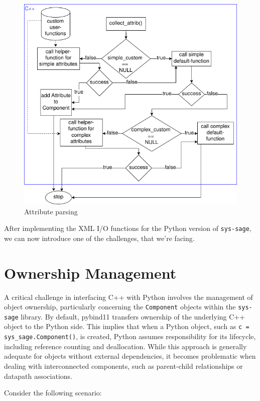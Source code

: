 \begin{figure}[htpb]
    \centering
    \includegraphics[width=\textwidth]{figures/Attribute_from_xml.png}
    \caption{Attribute parsing}
    \label{fig:Attribute parsing}
\end{figure}

After implementing the XML I/O functions for the Python version of \verb|sys-sage|, we can now introduce one of the challenges, that we're facing.
\newpage
\section{Ownership Management}

A critical challenge in interfacing C++ with Python involves the management of object ownership, particularly concerning the \verb|Component| objects within the \verb|sys-sage| library. By default, pybind11 transfers ownership of the underlying C++ object to the Python side. This implies that when a Python object, such as \verb|c = sys_sage.Component()|, is created, Python assumes responsibility for its lifecycle, including reference counting and deallocation. While this approach is generally adequate for objects without external dependencies, it becomes problematic when dealing with interconnected components, such as parent-child relationships or datapath associations.

Consider the following scenario:

